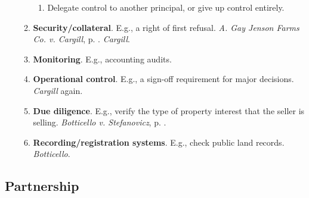 \begin{enumerate}
\begin{enumerate}
\begin{enumerate}
            \item Delegate control to another principal, or give up control 
            entirely.
        \end{enumerate}
        \item \textbf{Security/collateral}. E.g., a right of first refusal. 
        \emph{A. Gay Jenson Farms Co. v. Cargill}, p.  
        \pageref{subsub:cargill}. \emph{Cargill}.
        \item \textbf{Monitoring}. E.g., accounting audits.
        \item \textbf{Operational control}. E.g., a sign-off requirement for 
        major decisions. \emph{Cargill} again.
        \item \textbf{Due diligence}. E.g., verify the type of property 
        interest that the seller is selling. \emph{Botticello v. Stefanovicz}, 
        p. \pageref{par:botticello}.
        \item \textbf{Recording/registration systems}. E.g., check public land 
        records. \emph{Botticello}.
    \end{enumerate}
\end{enumerate}



\newpage

\subsection{Partnership}


